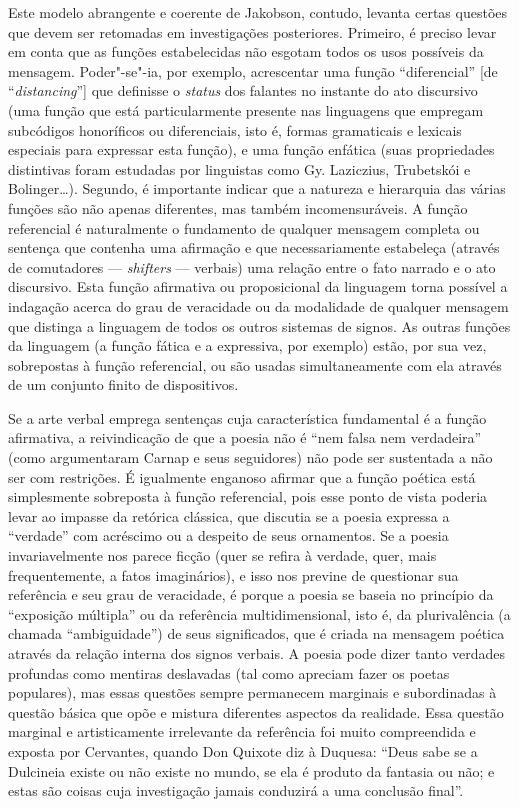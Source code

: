 Este modelo abrangente e coerente de Jakobson, contudo, levanta certas
questões que devem ser retomadas em investigações posteriores. Primeiro,
é preciso levar em conta que as funções estabelecidas não esgotam todos
os usos possíveis da mensagem. Poder"-se"-ia, por exemplo, acrescentar uma
função ``diferencial'' [de ``\emph{distancing}''] que definisse o
\emph{status} dos falantes no instante do ato discursivo (uma função que está
particularmente presente nas linguagens que empregam subcódigos
honoríficos ou diferenciais, isto é, formas gramaticais e lexicais
especiais para expressar esta função), e uma função enfática (suas
propriedades distintivas foram estudadas por linguistas como Gy.
Laziczius, Trubetskói e Bolinger\ldots{}). Segundo, é importante
indicar que a natureza e hierarquia das várias funções são não apenas
diferentes, mas também incomensuráveis. A função referencial é
naturalmente o fundamento de qualquer mensagem completa ou sentença que
contenha uma afirmação e que necessariamente estabeleça (através de
comutadores --- \emph{shifters} --- verbais) uma relação entre o fato
narrado e o ato discursivo. Esta função afirmativa ou proposicional da
linguagem torna possível a indagação acerca do grau de veracidade ou da
modalidade de qualquer mensagem que distinga a linguagem de todos os
outros sistemas de signos. As outras funções da linguagem (a função
fática e a expressiva, por exemplo) estão, por sua vez, sobrepostas à
função referencial, ou são usadas simultaneamente com ela através de um
conjunto finito de dispositivos.

Se a arte verbal emprega sentenças cuja característica fundamental é a
função afirmativa, a reivindicação de que a poesia não é ``nem falsa nem
verdadeira'' (como argumentaram Carnap e seus seguidores) não pode ser
sustentada a não ser com restrições. É igualmente enganoso afirmar que a
função poética está simplesmente sobreposta à função referencial, pois
esse ponto de vista poderia levar ao impasse da retórica clássica, que
discutia se a poesia expressa a ``verdade'' com acréscimo ou a
despeito de seus ornamentos. Se a poesia invariavelmente nos parece
ficção (quer se refira à verdade, quer, mais frequentemente, a fatos
imaginários), e isso nos previne de questionar sua referência e seu grau
de veracidade, é porque a poesia se baseia no princípio da ``exposição
múltipla'' ou da referência multidimensional, isto é, da plurivalência
(a chamada ``ambiguidade'') de seus significados, que é criada na
mensagem poética através da relação interna dos signos verbais. A poesia
pode dizer tanto verdades profundas como mentiras deslavadas (tal como
apreciam fazer os poetas populares), mas essas questões sempre
permanecem marginais e subordinadas à questão básica que opõe e mistura
diferentes aspectos da realidade. Essa questão marginal e artisticamente
irrelevante da referência foi muito compreendida e exposta por
Cervantes, quando Don Quixote diz à Duquesa: ``Deus sabe se a Dulcineia
existe ou não existe no mundo, se ela é produto da fantasia ou não; e
estas são coisas cuja investigação jamais conduzirá a uma conclusão
final''.

